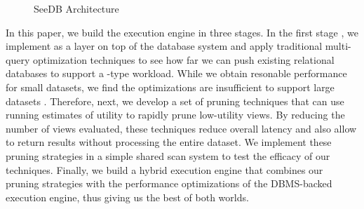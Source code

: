 \begin{figure}[htb]
\vspace{-10pt}
\centerline{
\hbox{}}
\vspace{-15pt}
\caption{SeeDB Architecture}
\label{fig:sys-arch}
\vspace{-15pt}
\end{figure} 

In this paper, we build the execution engine in three stages. 
In the first stage , we implement \SeeDB as a layer on top of the database system and apply traditional multi-query optimization 
techniques to see how far we can push existing relational databases to support a \SeeDB-type workload.
While we obtain resonable performance for small datasets, we find the optimizations are insufficient to support large datasets .
Therefore, next, we develop a set of pruning techniques that can use running estimates of utility to rapidly prune low-utility views. 
By reducing the number of views evaluated, these techniques reduce overall latency and also allow \SeeDB to return results without processing the entire dataset.
We implement these pruning strategies in a simple shared scan system to test the efficacy of our techniques.
Finally, we build a hybrid execution engine that combines our pruning strategies with the performance optimizations of the DBMS-backed execution engine,
thus giving us the best of both worlds. 


